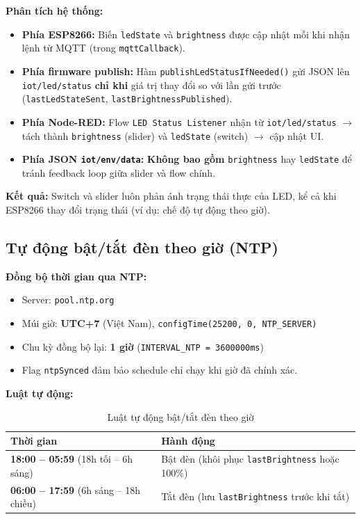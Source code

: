 \documentclass[13pt,a4paper]{article}
\newcommand{\code}[1]{\texttt{#1}}
\begin{document}
\textbf{Phân tích hệ thống:}

\begin{itemize}
    \item \textbf{Phía ESP8266:} Biến \code{ledState} và \code{brightness} được cập nhật mỗi khi nhận lệnh từ MQTT (trong \code{mqttCallback}).
    \item \textbf{Phía firmware publish:} Hàm \code{publishLedStatusIfNeeded()} gửi JSON lên \code{iot/led/status} \textbf{chỉ khi} giá trị thay đổi so với lần gửi trước (\code{lastLedStateSent}, \code{lastBrightnessPublished}).
    \item \textbf{Phía Node-RED:} Flow \code{LED Status Listener} nhận từ \code{iot/led/status} $\rightarrow$ tách thành \code{brightness} (slider) và \code{ledState} (switch) $\rightarrow$ cập nhật UI.
    \item \textbf{Phía JSON \code{iot/env/data}:} \textbf{Không bao gồm} \code{brightness} hay \code{ledState} để tránh feedback loop giữa slider và flow chính.
\end{itemize}

\textbf{Kết quả:} Switch và slider luôn phản ánh trạng thái thực của LED, kể cả khi ESP8266 thay đổi trạng thái (ví dụ: chế độ tự động theo giờ).

\subsection{Tự động bật/tắt đèn theo giờ (NTP)}
\label{sec:schedule}

\textbf{Đồng bộ thời gian qua NTP:}

\begin{itemize}
    \item Server: \code{pool.ntp.org}
    \item Múi giờ: \textbf{UTC+7} (Việt Nam), \code{configTime(25200, 0, NTP\_SERVER)}
    \item Chu kỳ đồng bộ lại: \textbf{1 giờ} (\code{INTERVAL\_NTP = 3600000ms})
    \item Flag \code{ntpSynced} đảm bảo schedule chỉ chạy khi giờ đã chính xác.
\end{itemize}

\textbf{Luật tự động:}

\begin{table}[htbp]
    \centering
    \caption{Luật tự động bật/tắt đèn theo giờ}
    \label{tbl:schedule}
    \begin{tabular}{|C{5cm}|C{7cm}|}
        \hline
        \textbf{Thời gian} & \textbf{Hành động} \\
        \hline
        \textbf{18:00 -- 05:59} (18h tối -- 6h sáng) & Bật đèn (khôi phục \code{lastBrightness} hoặc 100\%) \\
        \hline
        \textbf{06:00 -- 17:59} (6h sáng -- 18h chiều) & Tắt đèn (lưu \code{lastBrightness} trước khi tắt) \\
        \hline
    \end{tabular}
\end{table}
\end{document}
